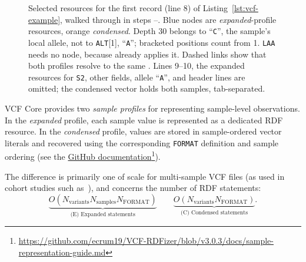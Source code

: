 \begin{figure}[htbp]
\caption{
  Selected resources for the first record (line 8) of Listing~\ref{lst:vcf-example}, walked through in steps --. 
  Blue nodes are \textit{expanded}-profile resources, orange \textit{condensed}. 
  Depth 30 belongs to ``\texttt{C}'', the sample's local allele, not to \texttt{ALT}[1], ``\texttt{A}''; bracketed positions count from 1. 
  \texttt{LAA} needs no node, because  already applies it. 
  Dashed links show that both profiles resolve to the same . 
  Lines 9--10, the expanded resources for \texttt{S2}, other fields, allele ``\texttt{A}'', and header lines are omitted; the condensed vector holds both samples, tab-separated.
  }
\label{fig:model}
\end{figure}

VCF Core provides two \emph{sample profiles} for representing sample-level observations.
In the \emph{expanded} profile, each sample value is represented as a dedicated RDF resource. 
In the \emph{condensed} profile, values are stored in sample-ordered vector literals and recovered using the corresponding \texttt{FORMAT} definition and sample ordering (see the \href{https://github.com/ecrum19/VCF-RDFizer/blob/v3.0.3/docs/sample-representation-guide.md}{GitHub documentation}\footnote{\url{https://github.com/ecrum19/VCF-RDFizer/blob/v3.0.3/docs/sample-representation-guide.md}}).

The difference is primarily one of scale for multi-sample VCF files (as used in cohort studies such as~\cite{1000genomes2015global}), and concerns the number of RDF statements:
\[
\underbrace{O\!\left(N_{\mathrm{variants}}N_{\mathrm{samples}}N_{\mathrm{FORMAT}}\right)}_{\text{(E) Expanded statements}}
\qquad
\underbrace{O\!\left(N_{\mathrm{variants}}N_{\mathrm{FORMAT}}\right)}_{\text{(C) Condensed statements}} .
\]

